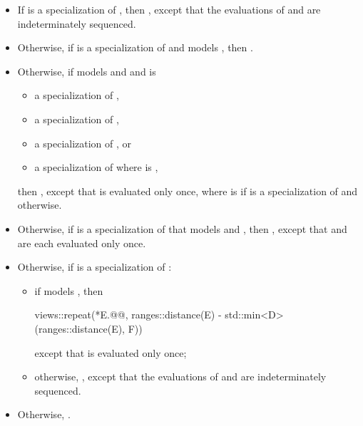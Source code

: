 \begin{itemize}
\item
If  is a specialization of
,
then ,
except that the evaluations of  and 
are indeterminately sequenced.

\item
Otherwise, if  is a specialization of 
and  models ,
then .
\item
Otherwise, if  models
 and 
and is
\begin{itemize}
\item a specialization of ,
\item a specialization of ,
\item a specialization of , or
\item a specialization of 
where  is ,
\end{itemize}
then ,
except that  is evaluated only once,
where  is 
if  is a specialization of  and  otherwise.

\item
Otherwise,
if  is
a specialization of 
that models  and ,
then
,
except that  and  are each evaluated only once.

\item
Otherwise, if  is
a specialization of :
\begin{itemize}
\item
if  models ,
then
\begin{codeblock}
views::repeat(*E.@@, ranges::distance(E) - std::min<D>(ranges::distance(E), F))
\end{codeblock}
except that  is evaluated only once;
\item
otherwise, ,
except that the evaluations of  and  are indeterminately sequenced.
\end{itemize}

\item
Otherwise, .
\end{itemize}

